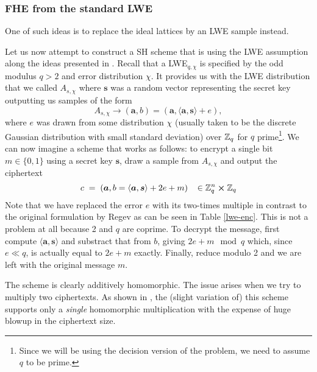 \subsubsection{FHE from the standard LWE}
 One of such ideas is to replace the ideal lattices by an LWE sample instead.


 Let us now attempt to construct a SH scheme that is using the LWE assumption along the ideas presented in \cite{fhe-lwe}. Recall that a LWE$_{q, \chi}$ is specified by the odd modulus $q > 2$ and error distribution $\chi$. It provides us with the LWE distribution that we called $A_{s, \chi}$ where $\bm{s}$ was a random vector representing the secret key outputting us samples of the form
\[A_{s, \chi} \rightarrow (\bm{a}, b) = (\bm{a}, \langle \bm{a}, \bm{s} \rangle + e),\]
where $e$ was drawn from some distribution $\chi$ (usually taken to be the discrete Gaussian distribution with small standard deviation) over $\mathbb{Z}_q$ for $q$ prime\footnote{Since we will be using the decision version of the problem, we need to assume $q$ to be prime.}. We can now imagine a scheme that works as follows: to encrypt a single bit $m \in \{0,1\}$ using a secret key $\bm{s}$, draw a sample from $A_{s, \chi}$ and output the ciphertext
\[ c \; = \; (\boldsymbol{a}, b = \langle \boldsymbol{a}, \boldsymbol{s} \rangle +2e +m) \; \; \; \in \mathbb{Z}_q^n \cross \mathbb{Z}_q \]
Note that we have replaced the error $e$ with its two-times multiple in contrast to the original formulation by Regev as can be seen in Table \ref{lwe-enc}. This is not a problem at all because 2 and $q$ are coprime. To decrypt the message, first compute $\langle \bm{a},\bm{s} \rangle$ and substract that from $b$, giving $2e + m \mod q$ which, since $e \ll q$, is actually equal to $2e +m$ exactly. Finally, reduce modulo 2 and we are left with the original message $m$.

The scheme is clearly additively homomorphic. The issue arises when we try to multiply two ciphertexts. As shown in \cite{one-mult}, the (slight variation of) this scheme supports only a \textit{single} homomorphic multiplication with the expense of huge blowup in the ciphertext size.

